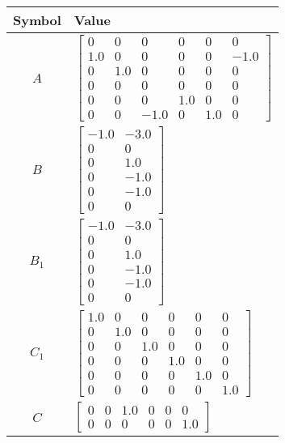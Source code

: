\begin{tabular}{cl}
\hline
  Symbol  & Value                                                                                                                                                                                           \\
\hline
   $A$    & $\left[\begin{matrix}0 & 0 & 0 & 0 & 0 & 0\\1.0 & 0 & 0 & 0 & 0 & -1.0\\0 & 1.0 & 0 & 0 & 0 & 0\\0 & 0 & 0 & 0 & 0 & 0\\0 & 0 & 0 & 1.0 & 0 & 0\\0 & 0 & -1.0 & 0 & 1.0 & 0\end{matrix}\right]$ \\
   $B$    & $\left[\begin{matrix}-1.0 & -3.0\\0 & 0\\0 & 1.0\\0 & -1.0\\0 & -1.0\\0 & 0\end{matrix}\right]$                                                                                                 \\
 $B_{1}$  & $\left[\begin{matrix}-1.0 & -3.0\\0 & 0\\0 & 1.0\\0 & -1.0\\0 & -1.0\\0 & 0\end{matrix}\right]$                                                                                                 \\
 $C_{1}$  & $\left[\begin{matrix}1.0 & 0 & 0 & 0 & 0 & 0\\0 & 1.0 & 0 & 0 & 0 & 0\\0 & 0 & 1.0 & 0 & 0 & 0\\0 & 0 & 0 & 1.0 & 0 & 0\\0 & 0 & 0 & 0 & 1.0 & 0\\0 & 0 & 0 & 0 & 0 & 1.0\end{matrix}\right]$   \\
   $C$    & $\left[\begin{matrix}0 & 0 & 1.0 & 0 & 0 & 0\\0 & 0 & 0 & 0 & 0 & 1.0\end{matrix}\right]$                                                                                                       \\

\end{tabular}
